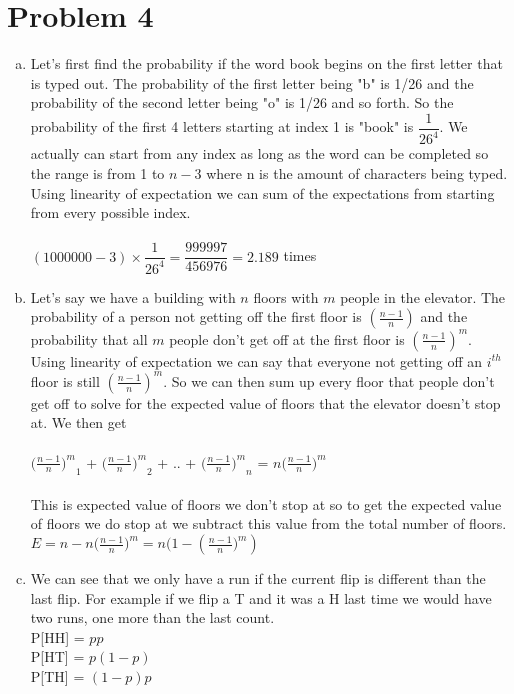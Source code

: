 \documentclass[11pt,letterpaper]{article}
\begin{document}
\section*{Problem 4}
\begin{enumerate}[(a)]
\item
Let's first find the probability if the word book begins on the first letter that is typed out. The probability of the first letter being "b" is 1/26 and the probability of the second letter being "o" is 1/26 and so forth. So the probability of the first 4 letters starting at index 1 is "book" is $\dfrac{1}{26^4}$. We actually can start from any index as long as the word can be completed so the range is from 1 to $n-3$ where n is the amount of characters being typed. Using linearity of expectation we can sum of the expectations from starting from every possible index.\\\\
$(1000000 - 3)\times \dfrac{1}{26^4} = \dfrac{999997}{456976} = 2.189$ times
\item
Let's say we have a building with $n$ floors with $m$ people in the elevator. The probability of a person not getting off the first floor is $(\frac{n-1}{n})$ and the probability that all $m$ people don't get off at the first floor is $(\frac{n-1}{n})^m$. Using linearity of expectation we can say that everyone not getting off an $i^{th}$  floor is still $(\frac{n-1}{n})^m$. So we can then sum up every floor that people don't get off to solve for the expected value of floors that the elevator doesn't stop at. We then get\\\\
 $({\frac{n-1}{n})^m}_{1}$ + $({\frac{n-1}{n})^m}_{2}$ + .. + $({\frac{n-1}{n})^m}_{n}$ = $n({\frac{n-1}{n})^m}$\\\\
This is expected value of floors we don't stop at so to get the expected value of floors we do stop at we subtract this value from the total number of floors.\\
$E = n -n({\frac{n-1}{n})^m} = n(1 -({\frac{n-1}{n})^m})$\\
\item
We can see that we only have a run if the current flip is different than the last flip. For example if we flip a T and it was a H last time we would have two runs, one more than the last count.\\
P[HH] = $pp$\\
P[HT] = $p(1-p)$\\
P[TH] = $(1-p)p$\\

\end{enumerate}
\end{document}

